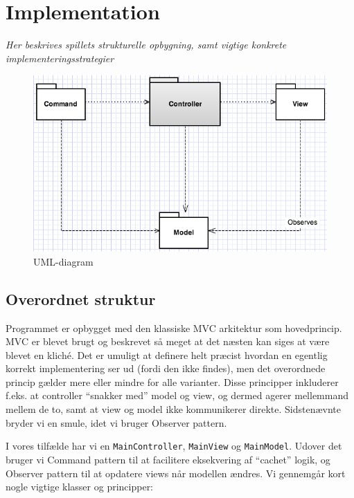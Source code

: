 \documentclass[titlepage,danish]{article}
\newcommand{\code}[1]{\texttt{#1}}
\begin{document}
\section{Implementation}
\emph{Her beskrives spillets strukturelle opbygning, samt vigtige konkrete implementeringsstrategier}
\begin{figure}[h!]
  \centering
  \includegraphics[scale=0.60]{MVC.png}
  \caption{UML-diagram}
  \label{fig:MVC_diagram}
  \end{figure}
\subsection{Overordnet struktur}
Programmet er opbygget med den klassiske MVC arkitektur som hovedprincip. MVC er blevet brugt og
beskrevet så meget at det næsten kan siges at være blevet en kliché. Det er umuligt at definere helt
præcist hvordan en egentlig korrekt implementering ser ud (fordi den ikke findes), men det
overordnede princip gælder mere eller mindre for alle varianter. Disse principper inkluderer
f.eks. at controller ``snakker med'' model og view, og dermed agerer mellemmand mellem de to, samt
at view og model ikke kommunikerer direkte. Sidstenævnte bryder vi en smule, idet vi bruger Observer
pattern.

I vores tilfælde har vi en \code{MainController}, \code{MainView} og \code{MainModel}. Udover det
bruger vi Command pattern til at facilitere eksekvering af ``cachet'' logik, og Observer pattern til
at opdatere views når modellen ændres. Vi gennemgår kort nogle vigtige klasser og principper:
\end{document}
